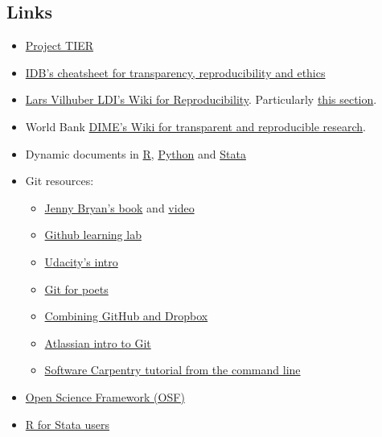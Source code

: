 \documentclass[]{book}
\providecommand{\tightlist}{%
  \setlength{\itemsep}{0pt}\setlength{\parskip}{0pt}}
\begin{document}
\hypertarget{links}{%
\subsection{Links}\label{links}}

\begin{itemize}
\tightlist
\item
  \href{https://www.projecttier.org/tier-protocol/}{Project TIER}\\
\item
  \href{http://idbdocs.iadb.org/wsdocs/getdocument.aspx?docnum=EZSHARE-1350314980-383}{IDB's cheatsheet for transparency, reproducibility and ethics}\\
\item
  \href{https://github.com/labordynamicsinstitute/replicability-training/wiki}{Lars Vilhuber LDI's Wiki for Reproducibility}. Particularly \href{https://github.com/labordynamicsinstitute/replicability-training/wiki/Prepare_and_run_replication}{this section}.\\
\item
  World Bank \href{https://dimewiki.worldbank.org/wiki/Main_Page}{DIME's Wiki for transparent and reproducible research}.
\item
  Dynamic documents in \href{https://rmarkdown.rstudio.com/gallery.html}{R}, \href{https://github.com/jupyter/jupyter/wiki/A-gallery-of-interesting-Jupyter-Notebooks\#economics-and-finance}{Python} and \href{https://github.com/BITSS/CEGA2019/blob/master/03-extra_dynamic_docs/02b-Stata-markdown/Stata\%20Markdown.pdf}{Stata}\\
\item
  Git resources:

  \begin{itemize}
  \tightlist
  \item
    \href{https://happygitwithr.com}{Jenny Bryan's book} and \href{https://www.rstudio.com/resources/videos/happy-git-and-gihub-for-the-user-tutorial/}{video}\\
  \item
    \href{https://lab.github.com/}{Github learning lab}
  \item
    \href{https://www.udacity.com/course/how-to-use-git-and-github--ud775}{Udacity's intro}\\
  \item
    \href{https://www.youtube.com/playlist?list=PLRqwX-V7Uu6ZF9C0YMKuns9sLDzK6zoiV}{Git for poets}\\
  \item
    \href{https://github.com/kbjarkefur/GitHubDropBox}{Combining GitHub and Dropbox}\\
  \item
    \href{https://www.atlassian.com/git/tutorials}{Atlassian intro to Git}
  \item
    \href{https://swcarpentry.github.io/git-novice/}{Software Carpentry tutorial from the command line}
  \end{itemize}
\item
  \href{https://osf.io}{Open Science Framework (OSF)}
\item
  \href{https://github.com/hblackburn/R4Econ/blob/master/Resources.md}{R for Stata users}
\end{itemize}


\end{document}
